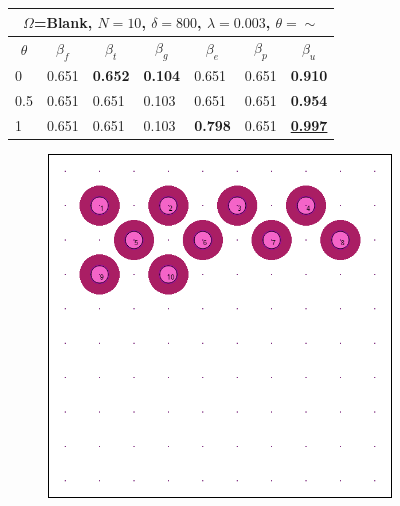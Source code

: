 \documentclass[letterpaper, 10 pt, conference]{ieeeconf}
\begin{document}
\begin{figure}[!h]
\begin{minipage}{\columnwidth}
{\begin{tabular}{lllllll}
\multicolumn{7}{|c|}{\textbf{$\Omega$=Blank, $N=10$,   $\delta=800$, $\lambda=0.003$, $\theta=\sim$}} \\ \hline
\multicolumn{1}{|c|}{\textbf{$\theta$}} & \multicolumn{1}{c|}{\textbf{$\beta_f$}} & \multicolumn{1}{c|}{\textbf{$\beta_t$}} & \multicolumn{1}{c|}{\textbf{$\beta_g$}} & \multicolumn{1}{c|}{\textbf{$\beta_e$}} & \multicolumn{1}{c|}{\textbf{$\beta_p$}} & \multicolumn{1}{c|}{\textbf{$\beta_u$}} \\ \hline
\multicolumn{1}{|l|}{0} & \multicolumn{1}{l|}{0.651} & \multicolumn{1}{l|}{\textbf{0.652}} & \multicolumn{1}{l|}{\textbf{0.104}} & \multicolumn{1}{l|}{0.651} & \multicolumn{1}{l|}{0.651} & \multicolumn{1}{l|}{\textbf{0.910}} \\ \hline
\multicolumn{1}{|l|}{0.5} & \multicolumn{1}{l|}{0.651} & \multicolumn{1}{l|}{0.651} & \multicolumn{1}{l|}{0.103} & \multicolumn{1}{l|}{0.651} & \multicolumn{1}{l|}{0.651} & \multicolumn{1}{l|}{\textbf{0.954}} \\ \hline
\multicolumn{1}{|l|}{1} & \multicolumn{1}{l|}{0.651} & \multicolumn{1}{l|}{0.651} & \multicolumn{1}{l|}{0.103} & \multicolumn{1}{l|}{\textbf{0.798}} & \multicolumn{1}{l|}{0.651} & \multicolumn{1}{l|}{{\ul \textbf{0.997}}} \\ \hline
\end{tabular}%
}
\vspace{2mm}
\end{minipage}
\centering
\begin{subfigure}[t]{0.3\columnwidth}
    \centering
    \includegraphics[width=\columnwidth]{Figures/BlankRange35.png}

\end{subfigure}
\end{figure}
\end{document}
